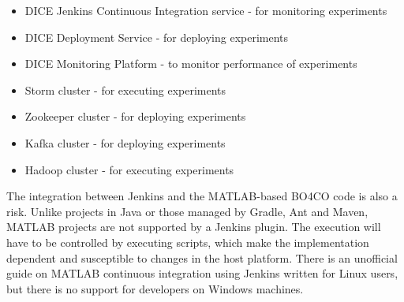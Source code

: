 \begin{itemize}
\item DICE Jenkins Continuous Integration service - for monitoring experiments
\item DICE Deployment Service - for deploying experiments
\item DICE Monitoring Platform - to monitor performance of experiments
\item Storm cluster - for executing experiments
\item Zookeeper cluster - for deploying experiments
\item Kafka cluster - for deploying experiments
\item Hadoop cluster - for executing experiments
\end{itemize}
The integration between Jenkins and the MATLAB-based BO4CO code is also a risk. Unlike projects in Java or those managed by Gradle, Ant and Maven, MATLAB projects are not supported by a Jenkins plugin. The execution will have to be controlled by executing scripts, which make the implementation dependent and susceptible to changes in the host platform. There is an unofficial guide on MATLAB continuous integration using Jenkins written for Linux users, but there is no support for developers on Windows machines.

